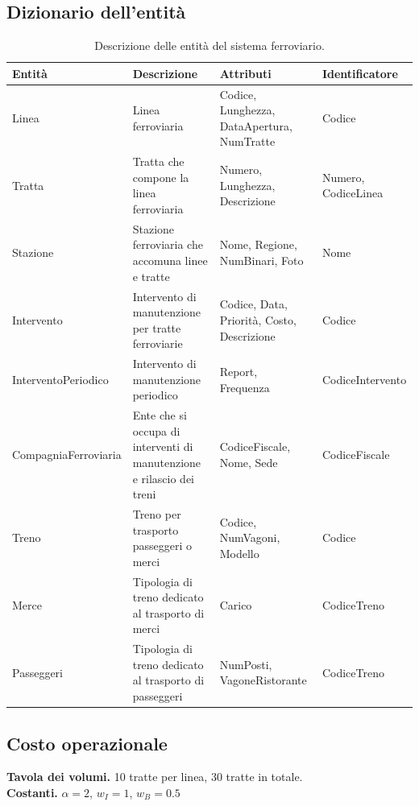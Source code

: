 \documentclass{article}
\begin{document}
\subsection*{Dizionario dell'entità}
\begin{table}[ht]
    \centering
    \begin{tabularx}{\textwidth}{|X|X|X|X|}
        \hline
        Entità & Descrizione & Attributi & Identificatore \\
        \hline
        Linea & Linea ferroviaria & Codice, Lunghezza, DataApertura, NumTratte & Codice \\        
        \hline
        Tratta & Tratta che compone la linea ferroviaria & Numero, Lunghezza, Descrizione & Numero, CodiceLinea \\
        \hline
        Stazione & Stazione ferroviaria che accomuna linee e tratte & Nome, Regione, NumBinari, Foto & Nome \\
        \hline
        Intervento & Intervento di manutenzione per tratte ferroviarie & Codice, Data, Priorità, Costo, Descrizione & Codice \\
        \hline
        InterventoPeriodico & Intervento di manutenzione periodico & Report, Frequenza & CodiceIntervento \\
        \hline
        CompagniaFerroviaria & Ente che si occupa di interventi di manutenzione e rilascio dei treni & CodiceFiscale, Nome, Sede & CodiceFiscale \\
        \hline
        Treno & Treno per trasporto passeggeri o merci & Codice, NumVagoni, Modello & Codice \\
        \hline
        Merce & Tipologia di treno dedicato al trasporto di merci & Carico & CodiceTreno \\
        \hline
        Passeggeri & Tipologia di treno dedicato al trasporto di passeggeri & NumPosti, VagoneRistorante & CodiceTreno \\
        \hline
    \end{tabularx}
    \caption{Descrizione delle entità del sistema ferroviario.}
    \label{tab:descrizione-entita}
\end{table}

\subsection*{Costo operazionale}
\large
\textbf{Tavola dei volumi.} 10 tratte per linea, 30 tratte in totale.\\
\textbf{Costanti.} $\alpha = 2$, $w_I = 1$, $w_B = 0.5$
\end{document}
